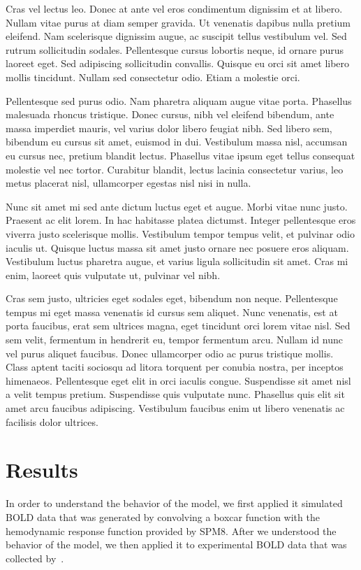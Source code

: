     Cras vel lectus leo. Donec at ante vel eros condimentum dignissim et at libero. Nullam vitae purus at diam semper gravida. Ut venenatis dapibus nulla pretium eleifend. Nam scelerisque dignissim augue, ac suscipit tellus vestibulum vel. Sed rutrum sollicitudin sodales. Pellentesque cursus lobortis neque, id ornare purus laoreet eget. Sed adipiscing sollicitudin convallis. Quisque eu orci sit amet libero mollis tincidunt. Nullam sed consectetur odio. Etiam a molestie orci.

    Pellentesque sed purus odio. Nam pharetra aliquam augue vitae porta. Phasellus malesuada rhoncus tristique. Donec cursus, nibh vel eleifend bibendum, ante massa imperdiet mauris, vel varius dolor libero feugiat nibh. Sed libero sem, bibendum eu cursus sit amet, euismod in dui. Vestibulum massa nisl, accumsan eu cursus nec, pretium blandit lectus. Phasellus vitae ipsum eget tellus consequat molestie vel nec tortor. Curabitur blandit, lectus lacinia consectetur varius, leo metus placerat nisl, ullamcorper egestas nisl nisi in nulla.

    Nunc sit amet mi sed ante dictum luctus eget et augue. Morbi vitae nunc justo. Praesent ac elit lorem. In hac habitasse platea dictumst. Integer pellentesque eros viverra justo scelerisque mollis. Vestibulum tempor tempus velit, et pulvinar odio iaculis ut. Quisque luctus massa sit amet justo ornare nec posuere eros aliquam. Vestibulum luctus pharetra augue, et varius ligula sollicitudin sit amet. Cras mi enim, laoreet quis vulputate ut, pulvinar vel nibh.

    Cras sem justo, ultricies eget sodales eget, bibendum non neque. Pellentesque tempus mi eget massa venenatis id cursus sem aliquet. Nunc venenatis, est at porta faucibus, erat sem ultrices magna, eget tincidunt orci lorem vitae nisl. Sed sem velit, fermentum in hendrerit eu, tempor fermentum arcu. Nullam id nunc vel purus aliquet faucibus. Donec ullamcorper odio ac purus tristique mollis. Class aptent taciti sociosqu ad litora torquent per conubia nostra, per inceptos himenaeos. Pellentesque eget elit in orci iaculis congue. Suspendisse sit amet nisl a velit tempus pretium. Suspendisse quis vulputate nunc. Phasellus quis elit sit amet arcu faucibus adipiscing. Vestibulum faucibus enim ut libero venenatis ac facilisis dolor ultrices.
  \section{\label{sec:results} Results} 
   In order to understand the behavior of the model, we first applied it simulated BOLD data that was generated by convolving a boxcar function with the hemodynamic response function provided by SPM8.  After we understood the behavior of the model, we then applied it to experimental BOLD data that was collected by~\citet{dhamala}.

